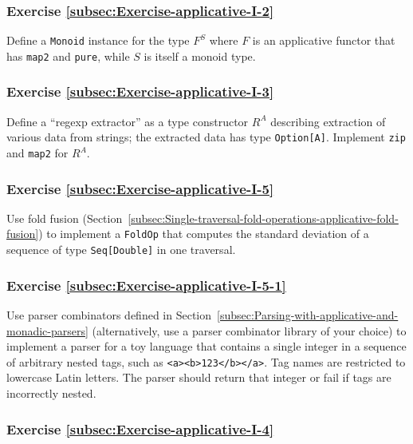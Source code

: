 \subsubsection{Exercise \label{subsec:Exercise-applicative-I-2}\ref{subsec:Exercise-applicative-I-2}}

Define a \lstinline!Monoid! instance for the type $F^{S}$ where
$F$ is an applicative functor that has \lstinline!map2! and \lstinline!pure!,
while $S$ is itself a monoid type.

\subsubsection{Exercise \label{subsec:Exercise-applicative-I-3}\ref{subsec:Exercise-applicative-I-3}}

Define a \textsf{``}regexp extractor\textsf{''} as a type constructor $R^{A}$ describing
extraction of various data from strings; the extracted data has type
\lstinline!Option[A]!. Implement \lstinline!zip! and \lstinline!map2!
for $R^{A}$.

\subsubsection{Exercise \label{subsec:Exercise-applicative-I-5}\ref{subsec:Exercise-applicative-I-5}}

Use fold fusion (Section~\ref{subsec:Single-traversal-fold-operations-applicative-fold-fusion})
to implement a \lstinline!FoldOp! that computes the standard deviation
of a sequence of type \lstinline!Seq[Double]! in one traversal.

\subsubsection{Exercise \label{subsec:Exercise-applicative-I-5-1}\ref{subsec:Exercise-applicative-I-5-1}}

Use parser combinators defined in Section~\ref{subsec:Parsing-with-applicative-and-monadic-parsers}
(alternatively, use a parser combinator library of your choice) to
implement a parser for a toy language that contains a single integer
in a sequence of arbitrary nested tags, such as \lstinline!<a><b>123</b></a>!.
Tag names are restricted to lowercase Latin letters. The parser should
return that integer or fail if tags are incorrectly nested.

\subsubsection{Exercise \label{subsec:Exercise-applicative-I-4}\ref{subsec:Exercise-applicative-I-4}}

